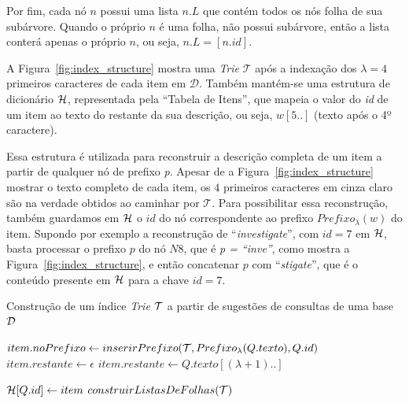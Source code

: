 Por fim, cada nó $n$ possui uma lista $n.L$ que contém todos os nós folha de sua subárvore. Quando o próprio $n$ é uma folha, não possui subárvore, então a lista conterá apenas o próprio $n$, ou seja, $n.L = [n.id]$.

A Figura~\ref{fig:index_structure} mostra uma \textit{Trie} $\mathcal{T}$ após a indexação dos $\lambda = 4$ primeiros caracteres de cada item em $\mathcal{D}$. Também mantém-se uma estrutura de dicionário $\mathcal{H}$, representada pela ``Tabela de Itens'', que mapeia o valor do \textit{id} de um item ao texto do restante da sua descrição, ou seja, $w[5..]$ (texto após o 4º caractere).

Essa estrutura é utilizada para reconstruir a descrição completa de um item a partir de qualquer nó de prefixo \textit{p}. Apesar de a Figura~\ref{fig:index_structure} mostrar o texto completo de cada item, os $4$ primeiros caracteres em cinza claro são na verdade obtidos ao caminhar por $\mathcal{T}$. Para possibilitar essa reconstrução, também guardamos em $\mathcal{H}$ o $id$ do nó correspondente ao prefixo $Prefixo_{\lambda}(w)$ do item. Supondo por exemplo a reconstrução de ``\textit{investigate}'', com $id=7$ em $\mathcal{H}$, basta processar o prefixo $p$ do nó $N8$, que é \textit{p = ``inve''}, como mostra a Figura~\ref{fig:index_structure}, e então concatenar $p$ com ``\textit{stigate}'', que é o conteúdo presente em $\mathcal{H}$ para a chave $id=7$.

\begin{algorithm}[ht]
\caption{Construção de um índice \textit{Trie} $\mathcal{T}$ a partir de sugestões de consultas de uma base $\mathcal{D}$}\label{alg:dataset_indexing}
\begin{algorithmic}[1]
        \State $item.noPrefixo \leftarrow inserirPrefixo(\mathcal{T}, Prefixo_{\lambda}(Q.texto), Q.id)$
            \State $item.restante \leftarrow \epsilon$
         \Else{}
            \State $item.restante \leftarrow Q.texto[(\lambda + 1)..]$
         \EndIf
         
         \State $\mathcal{H}[Q.id] \leftarrow item$
    \EndFor
    \State $construirListasDeFolhas(\mathcal{T})$
\EndFunction
\end{algorithmic}
\end{algorithm}

